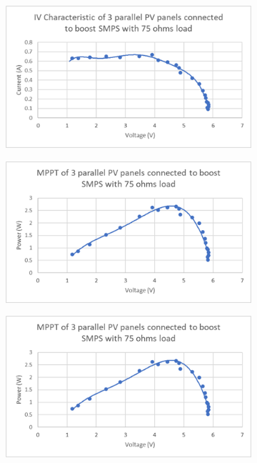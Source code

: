 \begin{figure}
    \centering
    \begin{subfigure}[b]{.45\linewidth}
        \includegraphics[width=\linewidth]{images/iv-3-load.png}
    \end{subfigure}
    \begin{subfigure}[b]{.45\linewidth}
        \includegraphics[width=\linewidth]{images/mppt-3-load.png}
    \end{subfigure}
    \begin{subfigure}[b]{.45\linewidth}
        \includegraphics[width=\linewidth]{images/mppt-3-load.png}
    \end{subfigure}
\end{figure}

